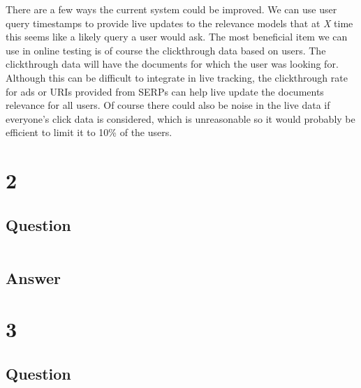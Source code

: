 \documentclass[letterpaper,11pt]{article}
\begin{document}
There are a few ways the current system could be improved.
We can use user query timestamps to provide live updates to the relevance models that at \textit{X} time this seems like a likely query a user would ask.
The most beneficial item we can use in online testing is of course the clickthrough data based on users.
The clickthrough data will have the documents for which the user was looking for.
Although this can be difficult to integrate in live tracking, the clickthrough rate for ads or URIs provided from SERPs can help live update the documents relevance for all users.
Of course there could also be noise in the live data if everyone's click data is considered, which is unreasonable so it would probably be efficient to limit it to 10\% of the users.



\clearpage


\section*{2}

\subsection*{Question}

\begin{verbatim}

\end{verbatim}

\subsection*{Answer}



\clearpage


\section*{3}

\subsection*{Question}
\end{document}
